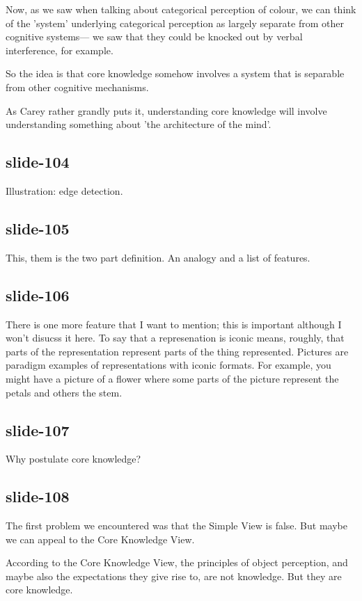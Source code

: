 \documentclass[12pt,\papersize]{extarticle}
\begin{document}
Now, as we saw when talking about categorical perception of colour, we can think of the 'system' underlying categorical perception as largely separate from other cognitive systems--- we saw that they could be knocked out by verbal interference, for example.

So the idea is that core knowledge somehow involves a system that is separable from other cognitive mechanisms.

As Carey rather grandly puts it, understanding core knowledge will involve understanding something about 'the architecture of the mind'.

\subsection{slide-104}
Illustration: edge detection.

\subsection{slide-105}
This, them is the two part definition.  An analogy and a list of features.

\subsection{slide-106}
There is one more feature that I want to mention; this is important
although I won't disucss it here.
To say that a represenation is iconic means, roughly, that parts of the
representation represent parts of the thing represented.
Pictures are paradigm examples of representations with iconic formats.
For example, you might have a picture of a flower where some parts of the
picture represent the petals and others the stem.
\subsection{slide-107}
Why postulate core knowledge?

\subsection{slide-108}
The first problem we encountered was that the Simple View is false.
But maybe we can appeal to the Core Knowledge View.

According to the Core Knowledge View, the principles of object perception, and maybe also the
expectations they give rise to, are not knowledge.
But they are core knowledge.
\end{document}
